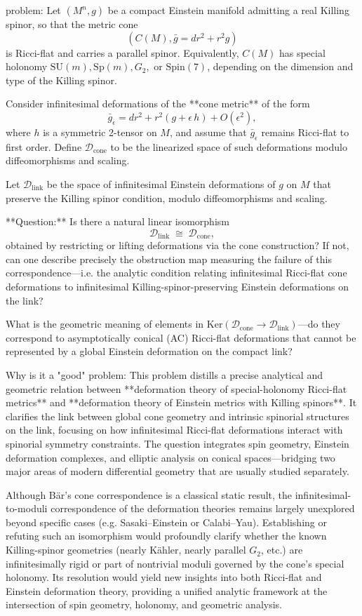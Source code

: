 problem:  
Let \((M^n, g)\) be a compact Einstein manifold admitting a real Killing spinor, so that the metric cone  
\[
(C(M), \bar g = dr^2 + r^2 g)
\]
is Ricci-flat and carries a parallel spinor.  Equivalently, \(C(M)\) has special holonomy \(\mathrm{SU}(m), \mathrm{Sp}(m), G_2,\) or \(\mathrm{Spin}(7)\), depending on the dimension and type of the Killing spinor.  

Consider infinitesimal deformations of the **cone metric** of the form  
\[
\bar g_\epsilon = dr^2 + r^2 (g + \epsilon\, h) + O(\epsilon^2),
\]
where \(h\) is a symmetric 2-tensor on \(M\), and assume that \(\bar g_\epsilon\) remains Ricci-flat to first order. Define \(\mathcal{D}_{\text{cone}}\) to be the linearized space of such deformations modulo diffeomorphisms and scaling.  

Let \(\mathcal{D}_{\text{link}}\) be the space of infinitesimal Einstein deformations of \(g\) on \(M\) that preserve the Killing spinor condition, modulo diffeomorphisms and scaling.  

**Question:**  
Is there a natural linear isomorphism
\[
\mathcal{D}_{\text{link}} \;\cong\; \mathcal{D}_{\text{cone}},
\]
obtained by restricting or lifting deformations via the cone construction?  
If not, can one describe precisely the obstruction map measuring the failure of this correspondence—i.e. the analytic condition relating infinitesimal Ricci-flat cone deformations to infinitesimal Killing-spinor-preserving Einstein deformations on the link?  

What is the geometric meaning of elements in \(\mathrm{Ker}(\mathcal{D}_{\text{cone}}\to\mathcal{D}_{\text{link}})\)—do they correspond to asymptotically conical (AC) Ricci-flat deformations that cannot be represented by a global Einstein deformation on the compact link?  

Why is it a "good" problem:  
This problem distills a precise analytical and geometric relation between **deformation theory of special-holonomy Ricci-flat metrics** and **deformation theory of Einstein metrics with Killing spinors**.  It clarifies the link between global cone geometry and intrinsic spinorial structures on the link, focusing on how infinitesimal Ricci-flat deformations interact with spinorial symmetry constraints.  The question integrates spin geometry, Einstein deformation complexes, and elliptic analysis on conical spaces—bridging two major areas of modern differential geometry that are usually studied separately.  

Although Bär’s cone correspondence is a classical static result, the infinitesimal-to-moduli correspondence of the deformation theories remains largely unexplored beyond specific cases (e.g. Sasaki–Einstein or Calabi–Yau).  Establishing or refuting such an isomorphism would profoundly clarify whether the known Killing-spinor geometries (nearly Kähler, nearly parallel \(G_2\), etc.) are infinitesimally rigid or part of nontrivial moduli governed by the cone’s special holonomy.  Its resolution would yield new insights into both Ricci-flat and Einstein deformation theory, providing a unified analytic framework at the intersection of spin geometry, holonomy, and geometric analysis.